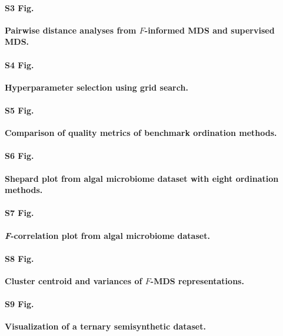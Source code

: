 \documentclass[10pt,letterpaper]{article}
\newcommand{\1}{{\rm 1}\kern-0.24em{\rm I}}
\begin{document}
\paragraph*{S3 Fig.}
\label{fig:sim_fmds_smds}
\textbf{Pairwise distance analyses from $F$-informed MDS and supervised MDS.}

\paragraph*{S4 Fig.}
\label{fig:fmds_gridsearch}
\textbf{Hyperparameter selection using grid search.}

\paragraph*{S5 Fig.}
\label{fig:sim_eval_all}
\textbf{Comparison of quality metrics of benchmark ordination methods.}

\paragraph*{S6 Fig.}
\label{fig:shepard_alga_all}
\textbf{Shepard plot from algal microbiome dataset with eight ordination methods.}

\paragraph*{S7 Fig.}
\label{fig:f_corr_alga_all}
\textbf{\textit{F}-correlation plot from algal microbiome dataset.}

\paragraph*{S8 Fig.}
\label{fig:fmds_rep_analysis}
\textbf{Cluster centroid and variances of $F$-MDS representations.} 

\paragraph*{S9 Fig.}
\label{fig:sim_ternary_vis}
\textbf{Visualization of a ternary semisynthetic dataset.}
\end{document}

